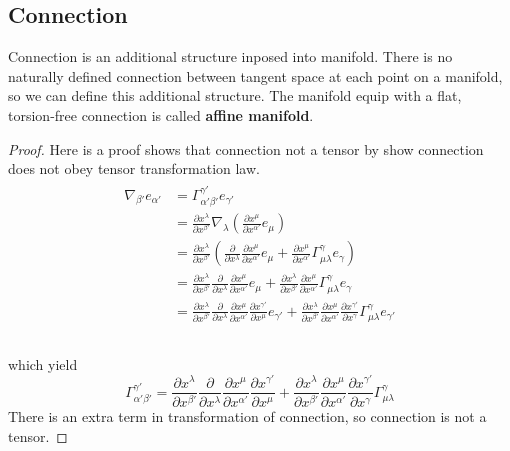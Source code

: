 \documentclass[12pt]{article}
\theoremstyle{mystyle}{\newtheorem{definition}{Definition}[section]}
\theoremstyle{mystyle}{\newtheorem{theorem}[definition]{Theorem}}
\theoremstyle{mystyle}{\newtheorem*{remark}{Remark}}
\theoremstyle{mystyle}{\newtheorem*{example}{Example}}
\theoremstyle{mystyle}{\newtheorem*{examples}{Examples}}
\theoremstyle{cstyle}{\newtheorem*{cthm}{}}
\begin{document}
\subsection{Connection}
Connection is an additional structure inposed into manifold. 
There is no naturally defined connection between tangent space at each point on a manifold,
so we can define this additional structure. 
The manifold equip with a flat, torsion-free connection is called \textbf{affine manifold}.
\begin{proof}
  Here is a proof shows that connection not a tensor by show connection does not obey tensor transformation law.
  \begin{align*}
    \begin{split}
      \nabla_{\beta'}e_{\alpha'} & = \Gamma^{\gamma'}_{\alpha'\beta'}e_{\gamma'} \\
      &= \frac{\partial x^{\lambda}}{\partial x^{\beta'}}\nabla_{\lambda}(\frac{\partial x^{\mu}}{\partial x^{\alpha'}}e_{\mu})\\
      &= \frac{\partial x^{\lambda}}{\partial x^{\beta'}}(\frac{\partial}{\partial x^{\lambda}}\frac{\partial x^{\mu}}{\partial x^{\alpha'}}e_{\mu}
      + \frac{\partial x^{\mu}}{\partial x^{\alpha'}} \Gamma ^{\gamma}_{\mu\lambda} e_{\gamma})\\
      &= \frac{\partial x^{\lambda}}{\partial x^{\beta'}}\frac{\partial}{\partial x^{\lambda}}\frac{\partial x^{\mu}}{\partial x^{\alpha'}}e_{\mu}
      + \frac{\partial x^{\lambda}}{\partial x^{\beta'}}\frac{\partial x^{\mu}}{\partial x^{\alpha'}} \Gamma ^{\gamma}_{\mu\lambda} e_{\gamma}\\
      &= \frac{\partial x^{\lambda}}{\partial x^{\beta'}}\frac{\partial}{\partial x^{\lambda}}\frac{\partial x^{\mu}}{\partial x^{\alpha'}}\frac{\partial x^{\gamma'}}{\partial x^{\mu}}e_{\gamma'}
      + \frac{\partial x^{\lambda}}{\partial x^{\beta'}}\frac{\partial x^{\mu}}{\partial x^{\alpha'}} \frac{\partial x^{\gamma'}}{\partial x^{\gamma}} \Gamma ^{\gamma}_{\mu\lambda}  e_{\gamma'}\\
    \end{split}
  \end{align*}
  \\
  which yield \[\Gamma^{\gamma'}_{\alpha'\beta'} = \frac{\partial x^{\lambda}}{\partial x^{\beta'}}\frac{\partial}{\partial x^{\lambda}}\frac{\partial x^{\mu}}{\partial x^{\alpha'}}\frac{\partial x^{\gamma'}}{\partial x^{\mu}}
    + \frac{\partial x^{\lambda}}{\partial x^{\beta'}}\frac{\partial x^{\mu}}{\partial x^{\alpha'}} \frac{\partial x^{\gamma'}}{\partial x^{\gamma}} \Gamma ^{\gamma}_{\mu\lambda}\]
  There is an extra term in transformation of connection, so connection is not a tensor.
\end{proof}
\end{document}
